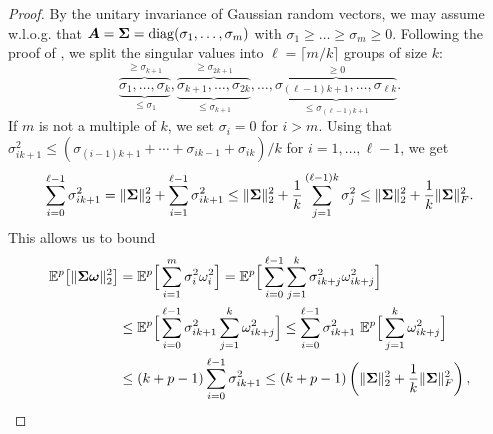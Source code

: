 \begin{proof}
By the unitary invariance of Gaussian random vectors, we may assume w.l.o.g. that $\boldsymbol{A} = \boldsymbol{\Sigma} = \operatorname{diag}(\sigma_1, \dots, \sigma_m)$ with $\sigma_1 \geq \dots \geq \sigma_m \geq 0$.
Following the proof of \cite[Theorem 1]{cohen-2016-optimal-approximate}, we split the singular values into $\ell = \lceil m/k \rceil$ groups of size $k$:
    \begin{equation}
        \overbrace{\underbrace{\sigma_1, \dots, \sigma_k}_{\leq \sigma_1}}^{\geq \sigma_{k+1}}, \overbrace{\underbrace{\sigma_{k+1}, \dots, \sigma_{2k}}_{\leq \sigma_{k+1}}}^{\geq \sigma_{2k+1}}, \dots, \overbrace{\underbrace{\sigma_{(\ell - 1)k + 1}, \dots, \sigma_{\ell k}}_{\leq \sigma_{(\ell - 1)k + 1}}}^{\geq 0}.
    \end{equation}
    If $m$ is not a multiple of $k$, we set $\sigma_i = 0$ for $i > m$. Using that
        $\sigma_{ik + 1}^2 \leq ( \sigma_{(i-1)k + 1} + \cdots + \sigma_{ik - 1} + \sigma_{ik} ) / k$ for $i = 1,\ldots, \ell-1$, we get
    \begin{equation}
        \sum_{i=0}^{\ell-1} \sigma_{ik + 1}^2 = \lVert \boldsymbol{\Sigma} \rVert _2^2 + \sum_{i=1}^{\ell-1} \sigma_{ik + 1}^2  \leq \lVert \boldsymbol{\Sigma} \rVert _2^2 + \frac{1}{k} \sum_{j=1}^{(\ell - 1)k} \sigma_j^2 \leq \lVert \boldsymbol{\Sigma} \rVert _2^2 + \frac{1}{k} \lVert \boldsymbol{\Sigma} \rVert _F^2.
        \label{equ:singular-value-group-bound}
    \end{equation}
    This allows us to bound
    \begin{align*}
    \mathbb{E}^{p}\big[ \lVert \boldsymbol{\Sigma} \boldsymbol{\omega} \rVert _2^2 \big] & = 
        \mathbb{E}^{p}\Big[ \sum_{i=1}^{m} \sigma_i^2 \omega_i^2 \Big]
        = \mathbb{E}^{p}\Big[ \sum_{i=0}^{\ell - 1} \sum_{j=1}^{k} \sigma_{ik + j}^2 \omega_{ik + j}^2 \Big] \\
        &\leq \mathbb{E}^{p}\Big[ \sum_{i=0}^{\ell - 1} \sigma_{ik + 1}^2 \sum_{j=1}^{k} \omega_{ik + j}^2 \Big] 
        \leq \sum_{i=0}^{\ell - 1} \sigma_{ik + 1}^2 ~ \mathbb{E}^{p}\Big[ \sum_{j=1}^{k} \omega_{ik + j}^2 \Big] \\
        &\leq (k + p - 1) \sum_{i=0}^{\ell - 1} \sigma_{ik + 1}^2 \leq (k + p - 1) \left( \lVert \boldsymbol{\Sigma} \rVert _2^2 + \frac{1}{k} \lVert \boldsymbol{\Sigma} \rVert _F^2 \right), 
    \end{align*}

\end{proof}
